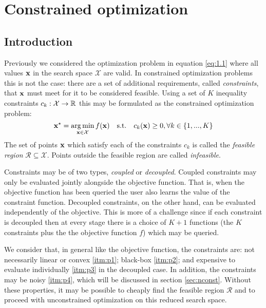 
\chapter{Constrained optimization} %

\label{Chapter4} %


\section{Introduction}

Previously we considered the optimization problem in equation \ref{eq:1.1} where all values $\mathbf{x}$ in the search space $\mathcal{X}$ are valid. In constrained optimization problems this is not the case: there are a set of additional requirements, called \textit{constraints}, that $\mathbf{x}$ must meet for it to be considered feasible. Using a set of $K$ inequality constraints $c_k : \mathcal{X} \to \mathbb{R}$ this may be formulated as the constrained optimization problem:
%
\begin{equation} \label{eq:cop}
\mathbf{x}^\star = \operatorname*{arg\,min}_{\mathbf{x}\in\mathcal{X}} f(\mathbf{x})\quad
\mathrm{s.t.}\quad c_k(\mathbf{x}) \geq 0, \forall k \in \{1,...,K\}
\end{equation}
%
The set of points $\mathbf{x}$ which satisfy each of the constraints $c_k$ is called the \textit{feasible region} $\mathcal{R}\subseteq\mathcal{X}$. Points outside the feasible region are called \textit{infeasible}.

Constraints may be of two types, \textit{coupled} or \textit{decoupled}. Coupled constraints may only be evaluated jointly alongside the objective function. That is, when the objective function has been queried the user also learns the value of the constraint function. Decoupled constraints, on the other hand, can be evaluated independently of the objective. This is more of a challenge since if each constraint is decoupled then at every stage there is a choice of $K+1$ functions (the $K$ constraints plus the the objective function $f$) which may be queried.

We consider that, in general like the objective function, the constraints are: not necessarily linear or convex \ref{itm:p1}; black-box \ref{itm:p2}; and expensive to evaluate individually \ref{itm:p3} in the decoupled case. In addition, the constraints may be noisy \ref{itm:p4}, which will be discussed in section \ref{sec:nconst}. Without these properties, it may be possible to cheaply find the feasible region $\mathcal{R}$ and to proceed with unconstrained optimization on this reduced search space.

